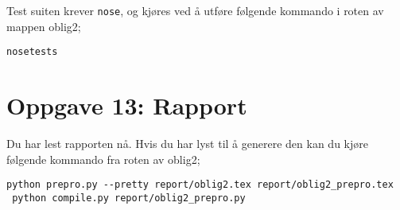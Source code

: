 \documentclass{article}
\begin{document}
Test suiten krever \verb;nose;, og kjøres ved å utføre følgende kommando i roten av mappen oblig2;

\begin{Verbatim}[numbers=none,frame=lines,label=\fbox{{\tiny Terminal}},fontsize=\fontsize{9pt}{9pt},labelposition=topline,framesep=2.5mm,framerule=0.7pt]
nosetests
\end{Verbatim}
\noindent


\section*{Oppgave 13: Rapport}

Du har lest rapporten nå. Hvis du har lyst til å generere den kan du kjøre følgende kommando fra roten av oblig2;

\begin{Verbatim}[numbers=none,frame=lines,label=\fbox{{\tiny Terminal}},fontsize=\fontsize{9pt}{9pt},labelposition=topline,framesep=2.5mm,framerule=0.7pt]
 python prepro.py --pretty report/oblig2.tex report/oblig2_prepro.tex
 python compile.py report/oblig2_prepro.py
\end{Verbatim}
\noindent
\end{document}
